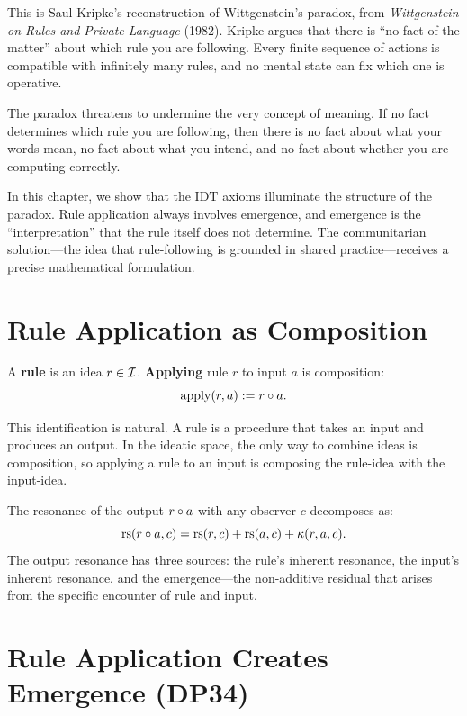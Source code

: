 This is Saul Kripke's reconstruction of Wittgenstein's paradox, from
\textit{Wittgenstein on Rules and Private Language} (1982).  Kripke
argues that there is ``no fact of the matter'' about which rule you are
following.  Every finite sequence of actions is compatible with infinitely
many rules, and no mental state can fix which one is operative.

The paradox threatens to undermine the very concept of meaning.  If no
fact determines which rule you are following, then there is no fact about
what your words mean, no fact about what you intend, and no fact about
whether you are computing correctly.

In this chapter, we show that the IDT axioms illuminate the structure
of the paradox.  Rule application always involves emergence, and
emergence is the ``interpretation'' that the rule itself does not
determine.  The communitarian solution---the idea that rule-following
is grounded in shared practice---receives a precise mathematical
formulation.

\section{Rule Application as Composition}

\begin{definition}
\label{def:rule-application}
A \textbf{rule} is an idea $r \in \mathcal{I}$.  \textbf{Applying} rule $r$
to input $a$ is composition:
\[
\mathrm{apply}(r, a) := r \circ a.
\]
\end{definition}

This identification is natural.  A rule is a procedure that takes an
input and produces an output.  In the ideatic space, the only way
to combine ideas is composition, so applying a rule to an input is
composing the rule-idea with the input-idea.

The resonance of the output $r \circ a$ with any observer $c$
decomposes as:
\[
\mathrm{rs}(r \circ a, c) = \mathrm{rs}(r, c) + \mathrm{rs}(a, c) + \kappa(r, a, c).
\]
The output resonance has three sources: the rule's inherent resonance,
the input's inherent resonance, and the emergence---the non-additive
residual that arises from the specific encounter of rule and input.

\section{Rule Application Creates Emergence (DP34)}

